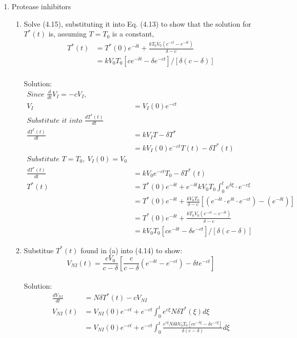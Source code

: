 \documentclass{article}
\begin{document}
\begin{enumerate}
	\item Protease inhibitors
	\begin{enumerate}
		\item Solve (4.15), substituting it into Eq. (4.13) to show that the solution for $T^{*}(t)$ is, assuming $T = T_0$ is a constant,
		\begin{align*}
			T^{*}(t) &= T^{*}(0) e^{-\delta t} + \frac{kT_0V_0(e^{-ct} - e^{-\delta t})}{\delta - c} \\
					 &= kV_0T_0[ce^{-\delta t} - \delta e^{-ct}]/[\delta (c - \delta)] 
		\end{align*}
		\\ Solution:
		\begin{align*}
			\textit{Since $\frac{d}{dt}V_I = -cV_I$, }\\
			V_I &= V_I(0)e^{-ct} \\
			\textit{Substitute it into $\frac{dT^{*}(t)}{dt}$} \\
			\frac{dT^{*}(t)}{dt} &= kV_IT - \delta T^{*} \\
								 &= kV_I(0)e^{-ct}T(t) - \delta T^{*}(t) \\
			\textit{Substitute $T = T_0,\ V_I(0) = V_0$} \\
			\frac{dT^{*}(t)}{dt} &= kV_0e^{-ct}T_0 - \delta T^{*}(t) \\
			T^{*}(t) &= T^{*}(0)e^{-\delta t} + e^{-\delta t}kV_0T_0\int_0^{t} e^{\delta \xi}\cdot e^{-c\xi} \\
					 &= T^{*}(0)e^{-\delta t} + \frac{kV_0T_0}{\delta - c}[(e^{-\delta t}\cdot e^{\delta t}\cdot e^{-ct}) - (e^{-\delta t})] \\
					 &= T^{*}(0)e^{-\delta t} + \frac{kT_0V_0(e^{-ct} - e^{-\delta t})}{\delta - c} \\
					 &= kV_0T_0[ce^{-\delta t} - \delta e^{-ct}]/[\delta(c - \delta)]
		\end{align*}
		\item Substitue $T^{*}(t)$ found in (a) into (4.14) to show:
		\begin{equation*}
			V_{NI}(t) = \frac{cV_0}{c - \delta}[\frac{c}{c - \delta}(e^{-\delta t} - e^{-ct})-\delta t e^{-ct}]
		\end{equation*}
		\\ Solution:
		\begin{align*}
			\frac{dV_{NI}}{dt} 	&= N\delta T^{*}(t) - cV_{NI}\\
			V_{NI}(t) 	&= V_{NI}(0)e^{-ct} + e^{-ct}\int_0^{t} e^{c\xi}N\delta T^{*}(\xi)d\xi\\
						&= V_{NI}(0)e^{-ct} + e^{-ct}\int_0^t \frac{e^{c\xi}N\delta k V_0T_0[ce^{-\delta\xi} - \delta e^{-c\xi}]}{\delta (c - \delta)}d\xi\\

\end{align*}
\end{enumerate}
\end{enumerate}
\end{document}
